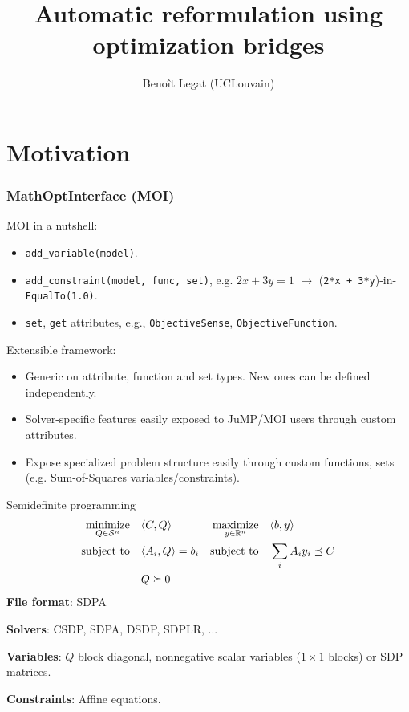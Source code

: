 \documentclass{beamer}
\title{Automatic reformulation using optimization bridges}
\author{Beno\^it Legat (UCLouvain)}
\institute{Los Alamos National Laboratory, 16th July 2019}
\begin{document}
  \maketitle

  \begin{frame}
    \tableofcontents
  \end{frame}

\section{Motivation}

  \begin{frame}[fragile]
    \frametitle{MathOptInterface (MOI)}
    MOI in a nutshell:
    \begin{itemize}
      \item \verb|add_variable(model)|.
      \item \verb|add_constraint(model, func, set)|, e.g. $2x + 3y = 1$ $\to$ (\verb|2*x + 3*y|)-in-\verb|EqualTo(1.0)|.
      \item \verb|set|, \verb|get| attributes, e.g., \verb|ObjectiveSense|, \verb|ObjectiveFunction|.
    \end{itemize}
    Extensible framework:
    \begin{itemize}
      \item \alert{Generic} on attribute, function and set types. New ones can be defined \alert{independently}.
      \item Solver-\alert{specific} features easily exposed to JuMP/MOI users through \alert{custom} attributes.
      \item Expose \alert{specialized} problem structure easily through \alert{custom} functions, sets (e.g. Sum-of-Squares variables/constraints).
    \end{itemize}
  \end{frame}

  \begin{frame}{Semidefinite programming}
    \begin{align*}
      \operatorname*{minimize}_{Q \in \mathcal{S}^n} \quad & \langle C, Q \rangle & \operatorname*{maximize}_{y \in \mathbb{R}^n} \quad & \langle b, y \rangle\\
      \operatorname*{\operatorname*{\text{subject to}}\quad} & \langle A_i, Q \rangle = b_i & \operatorname*{\operatorname*{\text{subject to}}\quad} & \sum_i A_i y_i \preceq C\\
        & Q \succeq 0
    \end{align*}
    \textbf{File format}: SDPA

    \textbf{Solvers}: CSDP, SDPA, DSDP, SDPLR, ...

    \textbf{Variables}: $Q$ block diagonal, nonnegative scalar variables ($1 \times 1$ blocks) or SDP matrices.

    \textbf{Constraints}: Affine equations.
  \end{frame}
\end{document}
